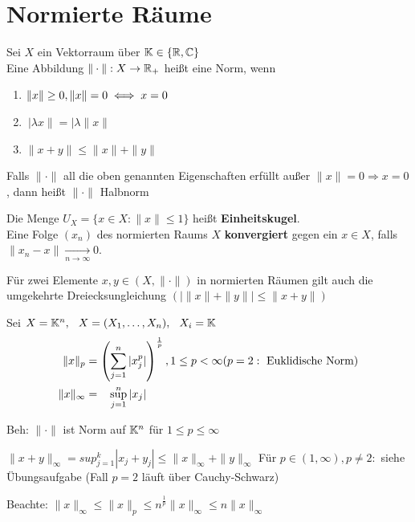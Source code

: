 \newpage
\section{Normierte Räume}

\begin{definition}
Sei $X$ ein Vektorraum über $\mathbb{K} \in\{ \mathbb{R}, \mathbb{C} \}$ \\
Eine Abbildung  $\| \cdot \|: X \rightarrow \mathbb{R}_{+}$ hei{\ss}t eine Norm, wenn
\begin{enumerate}
	\item $ \| x \| \geq 0, \| x \| = 0 \iff x = 0 $
	\item $\ | \lambda x \| = | \lambda \| x \| $
	\item $ \| x + y \| \leq \| x \| + \| y \| $
\end{enumerate}	
\end{definition}

\begin{bemerkung} Falls $ \| \cdot \| $ all die oben genannten Eigenschaften erfüllt au{\ss}er $ \| x \| = 0 \Rightarrow x = 0 $, dann hei{\ss}t $ \| \cdot \| $ Halbnorm
\end{bemerkung}

\begin{vereinbarung} 
Die Menge $ U_{X} = \{ x \in X:  \|x \| \leq 1 \}$ hei{\ss}t \textbf{Einheitskugel}. \\
Eine Folge $(x_{n})$ des normierten Raums $X$ \textbf{konvergiert} gegen ein $ x \in X $, falls  $\| x_{n} - x \| \xrightarrow[n \rightarrow \infty]{} 0. $	
\end{vereinbarung}


\begin{bemerkung}
Für zwei Elemente $x, y \in (X, \| \cdot \|)$ in normierten Räumen gilt auch die umgekehrte Dreiecksungleichung $( | \| x \| + \| y \| | \leq \| x + y \|)$
\end{bemerkung}

\begin{beispiel}
Sei $ X = \mathbb{K}^{n}, \hspace{0.25cm} X = ( X_{1}, \dotsc, X_{n}), \hspace{0.25cm} X_{i} = \mathbb{K}$ 
\begin{align*}
	\| x \|_{p} & = \left( \sum_{j = 1}^{n} |x_{j}^{p}| \right)^{\frac{1}{p}},  1 \leq p < \infty (p = 2: \text{ Euklidische Norm}) \\
	\| x \|_{\infty} & = \hspace{0.3cm} \sup_{j = 1}^{n} |x_{j}|	
\end{align*}

Beh: $\| \cdot \| $ ist Norm auf $\mathbb{K}^n$ für $1 \leq p \leq \infty$

$\| x + y \|_{\infty} = sup_{j = 1}^{k} |x_{j} + y_{j}| \leq \|x\|_{\infty} + \|y\|_{\infty} $
Für $p \in (1, \infty), p \neq 2:$ siehe Übungsaufgabe (Fall $p = 2$ läuft über Cauchy-Schwarz)

Beachte: $\|x\|_{\infty} \leq  \|x\|_{p} \leq n^{\frac{1}{p}} \|x\|_{\infty} \leq n \| x \|_{\infty}$
\end{beispiel}

